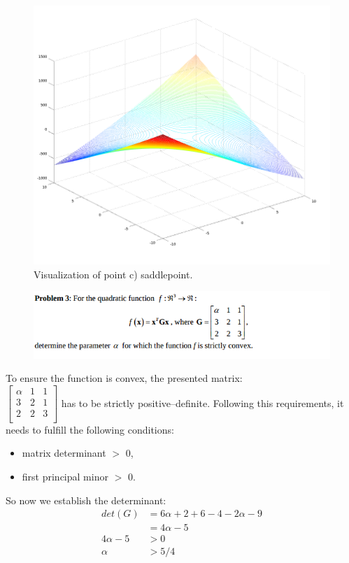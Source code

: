 \documentclass[eng,openany]{mgr}
\begin{document}
\begin{figure}[h]
\centering
\includegraphics[width=0.7\linewidth]{screenshot010}
\caption{Visualization of point c) saddlepoint.}
\label{fig:screenshot010}
\end{figure}

\clearpage
\begin{figure}[h]
\centering
\includegraphics[width=0.7\linewidth]{screenshot011}
\label{fig:screenshot011}
\end{figure}

To ensure the function is convex, the presented matrix:\\
\begin{math}
\begin{bmatrix}
\alpha & 1 & 1\\
3& 2& 1\\
2& 2& 3\\
\end{bmatrix}
\end{math}
has to be strictly positive--definite.
Following this requirements, it needs to fulfill the following conditions:
\begin{itemize}
	\item matrix determinant $>$ 0,
	\item first principal minor $>$ 0.
\end{itemize}
So now we establish the determinant:\\
\begin{align*}
det(G) &= 6\alpha + 2 + 6 -4 - 2\alpha - 9\\
 &= 4 \alpha - 5
 \\
 4\alpha -5 &> 0\\
 \alpha &> 5/4
\end{align*}
\end{document}
